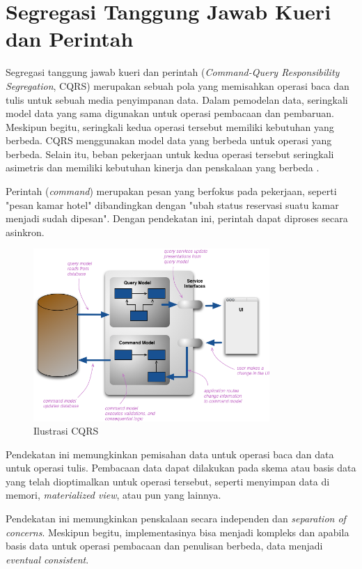 \section{Segregasi Tanggung Jawab Kueri dan Perintah}

Segregasi tanggung jawab kueri dan perintah (\textit{Command-Query Responsibility Segregation}, CQRS) merupakan sebuah pola yang memisahkan operasi baca dan tulis untuk sebuah media penyimpanan data. Dalam pemodelan data, seringkali model data yang sama digunakan untuk operasi pembacaan dan pembaruan. Meskipun begitu, seringkali kedua operasi tersebut memiliki kebutuhan yang berbeda. CQRS menggunakan model data yang berbeda untuk operasi yang berbeda. Selain itu, beban pekerjaan untuk kedua operasi tersebut seringkali asimetris dan memiliki kebutuhan kinerja dan penskalaan yang berbeda \parencite{msCQRS}.

Perintah (\textit{command}) merupakan pesan yang berfokus pada pekerjaan, seperti "pesan kamar hotel" dibandingkan dengan "ubah status reservasi suatu kamar menjadi sudah dipesan". Dengan pendekatan ini, perintah dapat diproses secara asinkron.

\begin{figure}[ht]
    \centering
    \includegraphics[width=0.8\textwidth]{resources/chapter-2/cqrs.png}
    \caption{Ilustrasi CQRS \parencite{fwCQRS}}
    \label{fig:cqrs-illustration}
\end{figure}

Pendekatan ini memungkinkan pemisahan data untuk operasi baca dan data untuk operasi tulis. Pembacaan data dapat dilakukan pada skema atau basis data yang telah dioptimalkan untuk operasi tersebut, seperti menyimpan data di memori, \textit{materialized view}, atau pun yang lainnya.

Pendekatan ini memungkinkan penskalaan secara independen dan \textit{separation of concerns}. Meskipun begitu, implementasinya bisa menjadi kompleks dan apabila basis data untuk operasi pembacaan dan penulisan berbeda, data menjadi \textit{eventual consistent}.